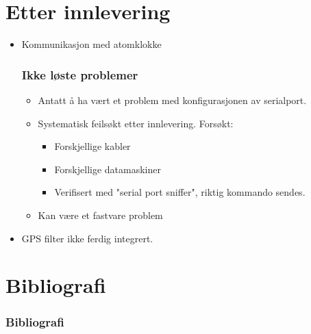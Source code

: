 \documentclass[xcolor=table]{beamer}
\begin{document}
\section{Etter innlevering}
\begin{frame}
  \begin{itemize}
  \item Kommunikasjon med atomklokke
    \frametitle{Ikke løste problemer}
    \begin{itemize}
      \item Antatt å ha vært et problem med konfigurasjonen av serialport.
      \item Systematisk feilsøkt etter innlevering. Forsøkt:
      \begin{itemize}
        \item Forskjellige kabler
        \item Forskjellige datamaskiner
        \item Verifisert med "serial port sniffer", riktig kommando sendes.
      \end{itemize}
      \item Kan være et fastvare problem
    \end{itemize}
  \item GPS filter ikke ferdig integrert.
  \end{itemize}
\end{frame}

\section{Bibliografi}
\begin{frame}[allowframebreaks]%
  \frametitle{Bibliografi}
  \printbibliography[heading=bibintoc]
\end{frame}
\end{document}
